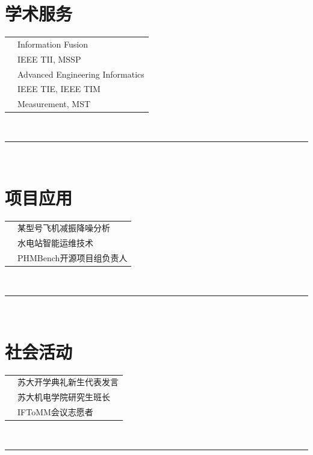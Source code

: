 \documentclass[oneside]{article}
\begin{document}
{\begin{minipage}[t][\dimexpr\textheight-2\fboxrule-2\fboxsep\relax][t]{\dimexpr0.4\textwidth-2\fboxrule-2\fboxsep\relax}
        \section*{\large 学术服务}
        \begin{tabularx}{\textwidth}{cY}
            \faJournalWhills{} & Information Fusion \\
            \faJournalWhills{} & IEEE TII, MSSP \\
            \faJournalWhills{} & Advanced Engineering Informatics \\
            \faJournalWhills{} & IEEE TIE, IEEE TIM \\
            \faJournalWhills{} & Measurement, MST \\
        \end{tabularx}
        \vspace{.3cm}
        \\
        \rule{\linewidth}{0.4pt}
        \\
        \section*{\large 项目应用}
        \begin{tabularx}{\textwidth}{cY}
            \faPlane{}      & 某型号飞机减振降噪分析 \\
            \faBolt{}       & 水电站智能运维技术 \\
            \faGithub{}     & PHMBench开源项目组负责人 \\
        \end{tabularx}
        \vspace{.3cm}
        \\
        \rule{\linewidth}{0.4pt}
        \\
        \section*{\large 社会活动}
        \begin{tabularx}{\textwidth}{cY}
            \faMicrophone{}  & 苏大开学典礼新生代表发言 \\
            \faUserTie{}     & 苏大机电学院研究生班长 \\
            \faHandsHelping{} & IFToMM会议志愿者 \\
        \end{tabularx}
        \vspace{.3cm}
        \\
        \rule{\linewidth}{0.4pt}
    \end{minipage}%
}%
\end{document}
